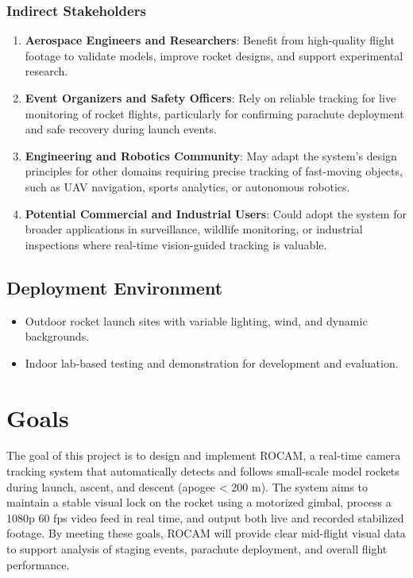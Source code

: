 \documentclass{article}
\begin{document}
\subsubsection*{Indirect Stakeholders}
\begin{enumerate}
  \item \textbf{Aerospace Engineers and Researchers}: Benefit from
        high-quality flight footage to validate models, improve rocket
        designs, and support experimental research.

  \item \textbf{Event Organizers and Safety Officers}: Rely on
        reliable tracking for live monitoring of rocket flights,
        particularly for confirming parachute deployment and safe
        recovery during launch events.

  \item \textbf{Engineering and Robotics Community}: May adapt the
        system’s design principles for other domains requiring precise
        tracking of fast-moving objects, such as UAV navigation, sports
        analytics, or autonomous robotics.

  \item \textbf{Potential Commercial and Industrial Users}: Could
        adopt the system for broader applications in surveillance,
        wildlife monitoring, or industrial inspections where real-time
        vision-guided tracking is valuable.
\end{enumerate}

\subsection{Deployment Environment}

\begin{itemize}
  \item Outdoor rocket launch sites with variable lighting, wind, and dynamic
        backgrounds.
  \item Indoor lab-based testing and demonstration for development and evaluation.
\end{itemize}

\section{Goals}

The goal of this project is to design and implement ROCAM, a real-time camera
tracking system that automatically detects and follows small-scale model
rockets during launch, ascent, and descent (apogee < 200 m). The system aims to
maintain a stable visual lock on the rocket using a motorized gimbal, process a
1080p 60 fps video feed in real time, and output both live and recorded
stabilized footage. By meeting these goals, ROCAM will provide clear mid-flight
visual data to support analysis of staging events, parachute deployment, and
overall flight performance.
\end{document}
